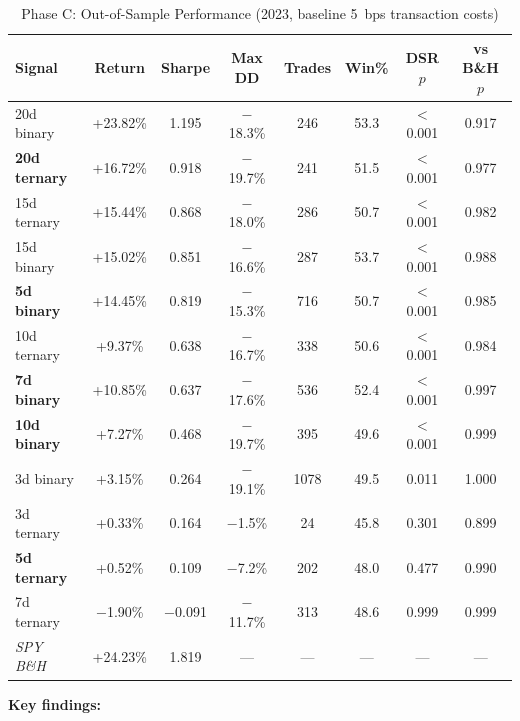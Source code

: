 \documentclass[12pt,a4paper]{article}
\begin{document}
\begin{table}[H]
\centering
\caption{Phase C: Out-of-Sample Performance (2023, baseline 5~bps transaction costs)}
\label{tab:phase_c}
\small
\begin{tabular}{lccccccc}
\toprule
Signal & Return & Sharpe & Max DD & Trades & Win\% & DSR $p$ & vs B\&H $p$ \\
\midrule
20d binary           & +23.82\% & 1.195 & $-$18.3\% & 246  & 53.3 & $<$0.001 & 0.917 \\
\textbf{20d ternary} & +16.72\% & 0.918 & $-$19.7\% & 241  & 51.5 & $<$0.001 & 0.977 \\
15d ternary          & +15.44\% & 0.868 & $-$18.0\% & 286  & 50.7 & $<$0.001 & 0.982 \\
15d binary           & +15.02\% & 0.851 & $-$16.6\% & 287  & 53.7 & $<$0.001 & 0.988 \\
\textbf{5d binary}   & +14.45\% & 0.819 & $-$15.3\% & 716  & 50.7 & $<$0.001 & 0.985 \\
10d ternary          & +9.37\%  & 0.638 & $-$16.7\% & 338  & 50.6 & $<$0.001 & 0.984 \\
\textbf{7d binary}   & +10.85\% & 0.637 & $-$17.6\% & 536  & 52.4 & $<$0.001 & 0.997 \\
\textbf{10d binary}  & +7.27\%  & 0.468 & $-$19.7\% & 395  & 49.6 & $<$0.001 & 0.999 \\
3d binary            & +3.15\%  & 0.264 & $-$19.1\% & 1078 & 49.5 & 0.011   & 1.000 \\
3d ternary           & +0.33\%  & 0.164 & $-$1.5\%  & 24   & 45.8 & 0.301   & 0.899 \\
\textbf{5d ternary}  & +0.52\%  & 0.109 & $-$7.2\%  & 202  & 48.0 & 0.477   & 0.990 \\
7d ternary           & $-$1.90\% & $-$0.091 & $-$11.7\% & 313  & 48.6 & 0.999 & 0.999 \\
\midrule
\textit{SPY B\&H}     & +24.23\% & 1.819 & --- & --- & --- & --- & --- \\
\bottomrule
\end{tabular}
\end{table}

\textbf{Key findings:}
\end{document}
